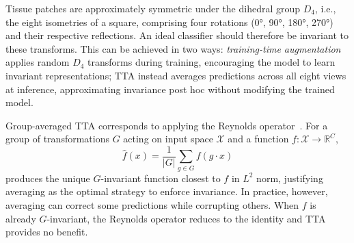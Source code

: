 \documentclass{melba}
\begin{document}
Tissue patches are approximately symmetric under the dihedral group $D_4$, i.e., the eight isometries of a square, comprising four rotations (0°, 90°, 180°, 270°) and their respective reflections. An ideal classifier should therefore be invariant to these transforms. This can be achieved in two ways: \emph{training-time augmentation} applies random $D_4$ transforms during training, encouraging the model to learn invariant representations; TTA instead averages predictions across all eight views at inference, approximating invariance post hoc without modifying the trained model.

Group-averaged TTA corresponds to applying the Reynolds operator~\citep{cohen2016group}. For a group of transformations $G$ acting on input space $\mathcal{X}$ and a function $f: \mathcal{X} \to \mathbb{R}^C$,
\begin{equation}
\hat{f}(x) = \frac{1}{|G|} \sum_{g \in G} f(g \cdot x)
\label{eq:reynolds}
\end{equation}
produces the unique $G$-invariant function closest to $f$ in $L^2$ norm, justifying averaging as the optimal strategy to enforce invariance. In practice, however, averaging can correct some predictions while corrupting others. When $f$ is already $G$-invariant, the Reynolds operator reduces to the identity and TTA provides no benefit.
\end{document}
